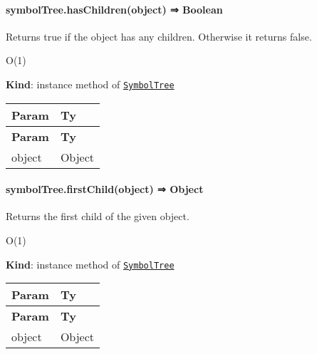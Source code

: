 \label{_module_symbol-tree--SymbolTree+hasChildren}%


\paragraph*{symbol\+Tree.\+has\+Children(object) ⇒ {\ttfamily Boolean}}

Returns {\ttfamily true} if the object has any children. Otherwise it returns {\ttfamily false}.


\begin{DoxyItemize}
\item {\ttfamily O(1)}
\end{DoxyItemize}

{\bfseries Kind}\+: instance method of {\ttfamily \href{#exp_module_symbol-tree--SymbolTree}{\tt Symbol\+Tree}}

\tabulinesep=1mm
\begin{longtabu} spread 0pt [c]{*{2}{|X[-1]}|}
\hline
\rowcolor{\tableheadbgcolor}\textbf{ Param  }&\textbf{ Ty   }\\
\endfirsthead
\hline
\endfoot
\hline
\rowcolor{\tableheadbgcolor}\textbf{ Param  }&\textbf{ Ty   }\\
\endhead
object  &{\ttfamily Object}   \\
\end{longtabu}


\label{_module_symbol-tree--SymbolTree+firstChild}%


\paragraph*{symbol\+Tree.\+first\+Child(object) ⇒ {\ttfamily Object}}

Returns the first child of the given object.


\begin{DoxyItemize}
\item {\ttfamily O(1)}
\end{DoxyItemize}

{\bfseries Kind}\+: instance method of {\ttfamily \href{#exp_module_symbol-tree--SymbolTree}{\tt Symbol\+Tree}}

\tabulinesep=1mm
\begin{longtabu} spread 0pt [c]{*{2}{|X[-1]}|}
\hline
\rowcolor{\tableheadbgcolor}\textbf{ Param  }&\textbf{ Ty   }\\
\endfirsthead
\hline
\endfoot
\hline
\rowcolor{\tableheadbgcolor}\textbf{ Param  }&\textbf{ Ty   }\\
\endhead
object  &{\ttfamily Object}   \\
\end{longtabu}


